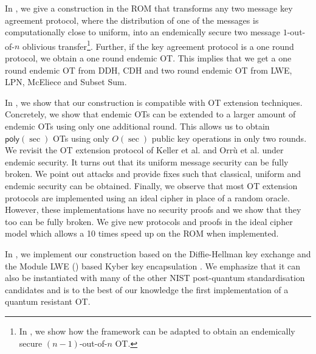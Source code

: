 In , we give a construction in the ROM that transforms any two message key agreement protocol, where the distribution of one of the messages is computationally close to uniform, into an endemically secure two message $1$-out-of-$n$ oblivious transfer\footnote{In , we show how the framework can be adapted to obtain an endemically secure $(n-1)$-out-of-$n$ OT.}. Further, 
if the key agreement protocol is a one round protocol, we obtain a one round endemic OT. This implies that we get a one round endemic OT from DDH, CDH and two round endemic OT from LWE, LPN, McEliece and Subset Sum.

In , we show that our construction is compatible with OT extension techniques. Concretely, we show that endemic OTs can be extended to a larger amount of endemic OTs using only one additional round. This allows us to obtain $\mathsf{poly}(\sec)$ OTs using only $O(\sec)$ public key operations in only two rounds. We revisit the OT extension protocol of Keller et al. and Orr{\`u} et al. \cite{C:KelOrsSch15,RSA:OrrOrsSch17} under endemic security. It turns out that its uniform message security can be fully broken. We point out attacks and provide fixes such that classical, uniform and endemic security can be obtained. Finally, we observe that most OT extension protocols are implemented \cite{libOTe,KOS,EMP} using an ideal cipher in place of a random oracle. However, these implementations have no security proofs and we show that they too can be fully broken. We give new protocols and proofs in the ideal cipher model which allows a 10 times speed up on the ROM when implemented.  

In , we implement our construction based on the Diffie-Hellman key exchange and the Module LWE (\MLWE) based Kyber key encapsulation \cite{NISTPQC-R1:CRYSTALS-KYBER17}. We emphasize that it can also be instantiated with many of the other NIST post-quantum standardisation candidates and is to the best of our knowledge the first implementation of a quantum resistant OT.


